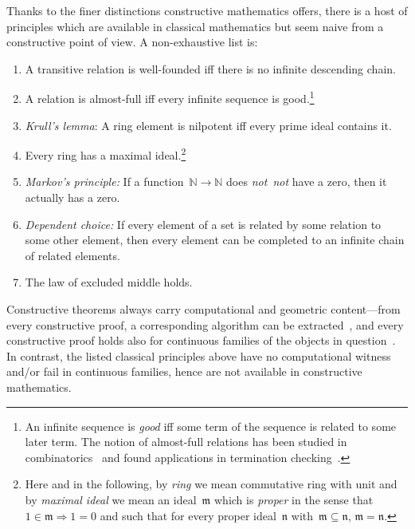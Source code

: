 \documentclass[envcountsect,envcountsame,runningheads]{llncs}
\newcommand{\mmm}{\mathfrak{m}}
\newcommand{\nnn}{\mathfrak{n}}
\newcommand{\NN}{\mathbb{N}}
\renewcommand{\_}{\mathpunct{.}\,}
\newcommand{\notnot}{\emph{not~not}\xspace}
\newcommand{\?}{\,{:}\,}
\begin{document}
\noindent
Thanks to the finer distinctions constructive mathematics offers, there is a
host of principles which are available in classical mathematics but seem naive
from a constructive point of view. A non-exhaustive list is:
\begin{enumerate}
\renewcommand{\theenumi}{\arabic{enumi}*}
\item A transitive relation is well-founded iff there is no infinite descending
chain.
\item A relation is almost-full iff every infinite sequence is good.\footnote{An infinite sequence is \emph{good} iff some term of the sequence is related to some later term. The notion
of almost-full relations
has been studied in combinatorics~\cite{vytiniotis-coquand-wahlstedt:af,carroy-pequignot:well,lescanne:well} and found applications in
termination checking~\cite{blass-gurevich:well}.}
\item \emph{Krull's lemma}: A ring element is nilpotent iff every prime
ideal contains it.
\item Every ring has a maximal ideal.\footnote{Here and in the following, by
\emph{ring} we mean commutative ring with unit and by \emph{maximal ideal} we
mean an ideal~$\mmm$ which is \emph{proper} in the sense that~$1 \in \mmm
\Rightarrow 1 = 0$ and such that for every proper ideal~$\nnn$ with~$\mmm
\subseteq \nnn$, $\mmm = \nnn$.}
\item \emph{Markov's principle:} If a function~$\NN \to \NN$ does \notnot have
a zero, then it actually has a zero.
\item \emph{Dependent choice:} If every element of a set is related by some relation to some other
element, then every element can be completed to an infinite chain of related
elements.
\item The law of excluded middle holds.
\end{enumerate}
Constructive theorems always carry computational and geometric
content---from every constructive proof, a corresponding algorithm can be
extracted~\cite{bauer:c2c}, and every constructive proof holds also for continuous families of
the objects in question~\cite[Section~4.3]{blechschmidt:filmat}. In contrast, the listed classical principles above have no
computational witness and/or fail in continuous families, hence are not
available in constructive mathematics.
\end{document}
